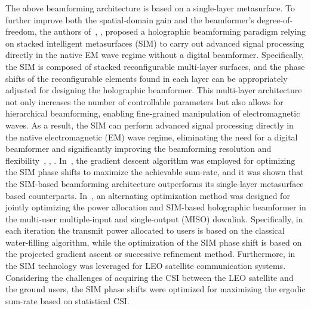 \documentclass[lettersize,journal]{IEEEtran}
\theoremstyle{remark}
\begin{document}
The above beamforming architecture is based on a single-layer metasurface. To further improve both the spatial-domain gain and the beamformer's degree-of-freedom, the authors of~\cite{an2023stacked}, \cite{an2023stacked_icc}, \cite{lin2024stacked} proposed a holographic beamforming paradigm relying on stacked intelligent metasurfaces (SIM) to carry out advanced signal processing directly in the native EM wave regime without a digital beamformer. Specifically, the SIM is composed of stacked reconfigurable multi-layer surfaces, and the phase shifts of the reconfigurable elements found in each layer can be appropriately adjusted for designing the holographic beamformer. This multi-layer architecture not only increases the number of controllable parameters but also allows for hierarchical beamforming, enabling fine-grained manipulation of electromagnetic waves. As a result, the SIM can perform advanced signal processing directly in the native electromagnetic (EM) wave regime, eliminating the need for a digital beamformer and significantly improving the beamforming resolution and flexibility~\cite{an2023stacked}, \cite{an2023stacked_icc}, \cite{lin2024stacked}. In~\cite{an2023stacked}, the gradient descent algorithm was employed for optimizing the SIM phase shifts to maximize the achievable sum-rate, and it was shown that the SIM-based beamforming architecture outperforms its single-layer metasurface based counterparts. In~\cite{an2023stacked_icc}, an alternating optimization method was designed for jointly optimizing the power allocation and SIM-based holographic beamformer in the multi-user multiple-input and single-output (MISO) downlink. Specifically, in each iteration the transmit power allocated to users is based on the classical water-filling algorithm, while the optimization of the SIM phase shift is based on the projected gradient ascent or successive refinement method. Furthermore, in~\cite{lin2024stacked} the SIM technology was leveraged for LEO satellite communication systems. Considering the challenges of acquiring the CSI between the LEO satellite and the ground users, the SIM phase shifts were optimized for maximizing the ergodic sum-rate based on statistical CSI.
\end{document}
